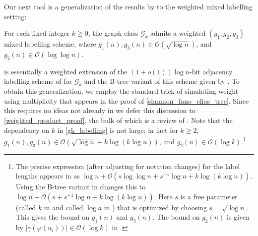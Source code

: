 \documentclass{patmorin}
\renewcommand{\ge}{\geqslant}
\renewcommand{\geq}{\geqslant}
\newcommand{\david}[1]{\noindent{\color{orange} DW: #1}}
\newcommand{\pat}[1]{\noindent\textcolor{Magenta}{PaMo: #1}}
\newcommand{\Oh}{\calO}
\newcommand{\calG}{\mathcal{G}}
\newcommand{\calO}{\mathcal{O}}
\begin{document}

  Our next tool is a generalization of the results by  \citet{dujmovic.esperet.ea:adjacency} to the weighted mixed labelling setting:

  \begin{thm}\label{gk_labelling}
    For each fixed integer $k\ge 0$, the graph class $\calG_{k}$
    admits a weighted $(g_1,g_2,g_3)$ mixed labelling scheme, where $g_1(n),g_3(n)\in \Oh(\sqrt{\log n})$, and $g_2(n)\in \Oh(\log\log n)$.
  \end{thm}


  \label{sketch_start}
   is essentially a weighted extension of the $(1+o(1))\log n$-bit adjacency labelling scheme of \citet{dujmovic.esperet.ea:adjacency} for $\calG_k$ and the B-tree variant of this scheme given by \citet{gawrychowski.janczewski:simpler}.
  To obtain this generalization, we employ the standard trick of simulating weight using multiplicity that appears in the proof of \cref{shannon_fano_elias_tree}.  Since this requires no ideas not already in \cite{gawrychowski.janczewski:simpler,dujmovic.esperet.ea:adjacency} we defer this discussion to \cref{weighted_product_proof}, the bulk of which is a review of \cite{gawrychowski.janczewski:simpler,dujmovic.esperet.ea:adjacency}.  Note that the dependency on $k$ in \cref{gk_labelling} is not large; in fact for $k\geq2$, $g_1(n),g_3(n)\in \Oh(\sqrt{\log n} + k\log(k\log n))$, and $g_2(n)\in\Oh(\log k)$.\footnote{The precise expression (after adjusting for notation changes) for the label lengths appears in  \cite[Section 5.4]{dujmovic.esperet.ea:adjacency} as $\log n + \Oh(s\log \log n + s^{-1}\log n + k\log (k\log n))$.  Using the B-tree variant in \cite{gawrychowski.janczewski:simpler} changes this to $\log n + \Oh(s + s^{-1}\log n + k\log(k\log n))$.  Here $s$ is a free parameter (called $k$ in \cite{dujmovic.esperet.ea:adjacency} and called $\log a$ in \cite{gawrychowski.janczewski:simpler}) that is optimized by choosing $s=\sqrt{\log n}$. This gives the bound on $g_1(n)$ and $g_3(n)$.  The bound on $g_2(n)$ is given by $|\gamma(\varphi(u_i))|\in \Oh(\log k)$ in  \cite[Section 5.4]{dujmovic.esperet.ea:adjacency}.}
\end{document}

